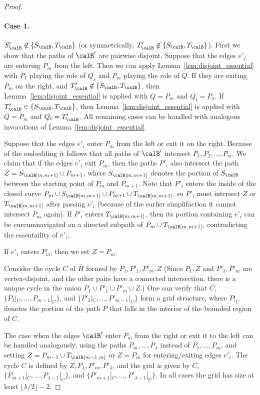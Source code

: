 \begin{proof}
\paragraph*{Case 1.} $S'_\calB\not\in \{S_\calB,T_\calB\}$ (or symmetrically, $T'_\calB\not\in \{S_\calB,T_\calB\}$).
First we show that the paths of $\calB'$ are pairwise disjoint. Suppose that the edges $e'_j$ are entering $P_m$ from the left. Then we can apply Lemma~\ref{lem:disjoint_essential} with $P_1$ playing the role of $Q_s$ and $P_m$ playing the role of $Q$.  If they are exiting $P_m$ on the right, and $T'_\calB \not\in \{S_\calB,T_\calB\}$, then Lemma~\ref{lem:disjoint_essential} is applied with $Q=P_m$ and $Q_t=P_\lambda$. If $T'_\calB \in \{S_\calB,T_\calB\}$, then Lemma~\ref{lem:disjoint_essential} is applied with $Q=P_m$ and $Q_t=T'_\calB$. All remaining cases can be handled with analogous invocations of Lemma~\ref{lem:disjoint_essential}.

Suppose that the edges $e'_i$ enter $P_m$ from the left or exit it on the right. Because of the embedding it follows that all paths of $\calB'$ intersect $P_1,P_2,\dots,P_m$. We claim that if the edges $e'_i$ exit $P_m$, then the paths $P'_i$ also intersect the path $Z=S_\calB[m,m+1]\cup P_{m+1}$, where $S_\calB[m,m+1]$ denotes the portion of $S_\calB$ between the starting point of $P_m$ and $P_{m+1}$. Note that $P'_i$ enters the inside of the closed curve $P_{m} \cup S_\calB[m,m+1] \cup P_{m+1} \cup T_\calB[m,m+1]$, so $P'_i$ must intersect $Z$ or $T_\calB[m,m+1]$ after passing $e'_i$ (because of the earlier simplifaction it cannot intersect $P_m$ again). If $P'_i$ enters $T_\calB[m,m+1]$, then its portion containing $e'_i$ can be curcumnavigated on a directed subpath of $P_m\cup T_\calB[m,m+1]$, contradicting the essentaility of $e'_i$.

If $e'_i$ enters $P_m$, then we set $Z=P_m$.

Consider the cycle $C$ of $\bar H$ formed by $P_1,P'_1,P'_m,Z$ (Since $P_1,Z$ and $P'_1,P'_m$ are vertex-disjoint, and the other pairs have a connected intersection, there is a unique cycle in the union $P_1 \cup P'_1 \cup P'_m \cup Z$.) One can verify that $C$, $\{P_2|_C,\dots,P_{m-1}|_C\}$, and $\{P'_2|_C,\dots,P'_{m-1}|_C\}$ form a grid structure, where $P|_C$ denotes the portion of the path $P$ that falls in the interior of the bounded region of $C$.

The case when the edges $\calB'$  enter $P_m$ from the right or exit it to the left can be handled analogously, using the paths $P_m,\dots,P_\lambda$ instead of $P_1,\dots, P_m$, and setting $Z=P_{m-1}\cup T_\calB[m-1,m]$ or $Z=P_m$ for entering/exiting edges $e'_i$. The cycle $C$ is defined by $Z,P_\lambda,P'_m,P'_\lambda$, and the grid is given by $C$, $\{P_{m+1}|_C,\dots,P_{\lambda-1}|_C\}$, and $\{P'_{m+1}|_C,\dots,P'_{\lambda-1}|_C\}$. In all cases the grid has size at least $\lfloor \lambda/2 \rfloor -2$.


\end{proof}

